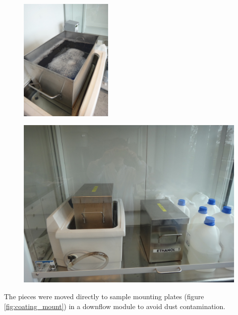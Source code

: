 \begin{figure}[htbp]
\centering
\begin{minipage}{.46\textwidth}
  \centering
  \includegraphics[height=6cm,trim= 0 100 0 200,clip]{figures/cast/soap_bath.jpg}
  \label{fig:cast_cleaning_soap}
\end{minipage}%
\hspace{20pt}
\begin{minipage}{.46\textwidth}
  \centering
  \includegraphics[width=1\linewidth]{figures/cast/acetone_and_ethanol.jpg}
  \label{fig:cast_cleaning_ethanol}
\end{minipage}
\end{figure}

The pieces were moved directly to sample mounting plates (figure \ref{fig:coating_mount}) in a downflow module to avoid dust contamination.

